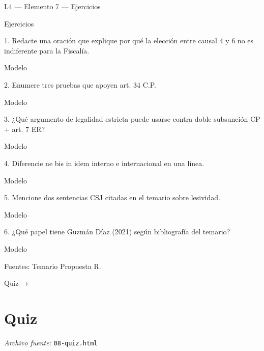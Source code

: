 \documentclass[11pt,a4paper]{article}
\begin{document}
    L4 — Elemento 7 — Ejercicios\par
    Ejercicios\par


      1. Redacte una oración que explique por qué la elección entre causal 4 y 6 no es indiferente para la Fiscalía.\par

      Modelo\par





      2. Enumere tres pruebas que apoyen art. 34 C.P.\par

      Modelo\par





      3. ¿Qué argumento de legalidad estricta puede usarse contra doble subsunción CP + art. 7 ER?\par

      Modelo\par





      4. Diferencie ne bis in idem interno e internacional en una línea.\par

      Modelo\par





      5. Mencione dos sentencias CSJ citadas en el temario sobre lesividad.\par

      Modelo\par





      6. ¿Qué papel tiene Guzmán Díaz (2021) según bibliografía del temario?\par

      Modelo\par




    Fuentes: Temario Propuesta R.\par

    Quiz →\par

\section{Quiz}
\noindent\textit{Archivo fuente:} \texttt{08-quiz.html}
\end{document}
